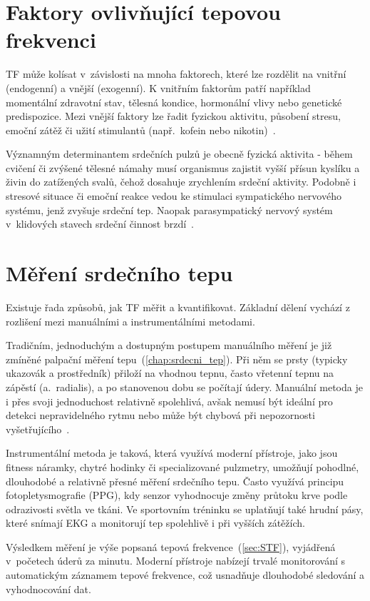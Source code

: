 \section{Faktory ovlivňující tepovou frekvenci}

\acs{TF} může kolísat v~závislosti na mnoha faktorech, které lze rozdělit na vnitřní (endogenní) a vnější (exogenní).
K vnitřním faktorům patří například momentální zdravotní stav, tělesná kondice, hormonální vlivy nebo genetické predispozice.
Mezi vnější faktory lze řadit fyzickou aktivitu, působení stresu, emoční zátěž či užití stimulantů (např.~kofein nebo nikotin)~\cite{faktoryOvlivnujiciTep}.

Významným determinantem srdečních pulzů je obecně fyzická aktivita - během cvičení či zvýšené tělesné námahy musí organismus zajistit vyšší přísun kyslíku a živin do zatížených svalů, čehož dosahuje zrychlením srdeční aktivity.
Podobně i stresové situace či emoční reakce vedou ke stimulaci sympatického nervového systému, jenž zvyšuje srdeční tep.
Naopak parasympatický nervový systém v~klidových stavech srdeční činnost brzdí~\cite{faktoryOvlivnujiciTep}.

\section{Měření srdečního tepu}

Existuje řada způsobů, jak \acs{TF} měřit a kvantifikovat.
Základní dělení vychází z rozlišení mezi manuálními a instrumentálními metodami.

Tradičním, jednoduchým a dostupným postupem manuálního měření je již zmíněné palpační měření tepu~(\ref{chap:srdecni_tep}).
Při něm se prsty (typicky ukazovák a prostředník) přiloží na vhodnou tepnu, často vřetenní tepnu na zápěstí (a.~radialis), a po stanovenou dobu se počítají údery.
Manuální metoda je i přes svoji jednoduchost relativně spolehlivá, avšak nemusí být ideální pro detekci nepravidelného rytmu nebo může být chybová při nepozornosti vyšetřujícího~\cite{vnitrniLekarstviVKostce}.

Instrumentální metoda je taková, která využívá moderní přístroje, jako jsou fitness náramky, chytré hodinky či specializované pulzmetry, umožňují pohodlné, dlouhodobé a relativně přesné měření srdečního tepu.
Často využívá principu fotopletysmografie (PPG), kdy senzor vyhodnocuje změny průtoku krve podle odrazivosti světla ve tkáni.
Ve sportovním tréninku se uplatňují také hrudní pásy, které snímají EKG a monitorují tep spolehlivě i při vyšších zátěžích.

Výsledkem měření je výše popsaná tepová frekvence~(\ref{sec:STF}), vyjádřená v~početech úderů za minutu.
Moderní přístroje nabízejí trvalé monitorování s automatickým záznamem tepové frekvence, což usnadňuje dlouhodobé sledování a vyhodnocování dat.
